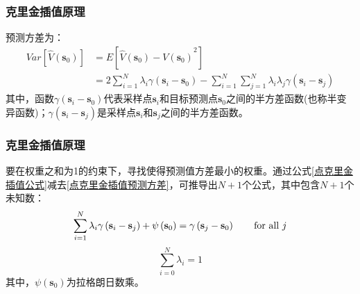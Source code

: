 \documentclass{beamer}
\begin{document}
\begin{frame}
    \frametitle{克里金插值原理}
    预测方差为：
    \begin{equation}
        \begin{split}
            Var\left[ \hat{V} \left( \mathbf{s}_{0} \right) \right]
            & = E\left[ {\hat{V}\left( \mathbf{s}_{0} \right) - V\left( \mathbf{s}_{0} \right)}^{2} \right]     \\
            & = 2 \sum_{i=1}^{N} \lambda_{i} \gamma\left( \mathbf{s}_{i} - \mathbf{s}_{0} \right) - \sum_{i=1}^{N} \sum_{j=1}^{N} \lambda_{i} \lambda_{j} \gamma\left( \mathbf{s}_{i} - \mathbf{s}_{j} \right)
        \end{split}
        \label{点克里金插值预测方差}
    \end{equation}
    其中，函数$ \gamma\left( \mathbf{s}_{i} - \mathbf{s}_{0} \right) $代表采样点$ \mathbf{s}_{i} $和目标预测点$ \mathbf{s}_{0} $之间的半方差函数(也称半变异函数)；$ \gamma\left( \mathbf{s}_{i} - \mathbf{s}_{j} \right) $是采样点$ \mathbf{s}_{i} $和$ \mathbf{s}_{j} $之间的半方差函数。
\end{frame}

\begin{frame}
    \frametitle{克里金插值原理}
    要在权重之和为1的约束下，寻找使得预测值方差最小的权重。通过公式\ref{点克里金插值公式}减去\ref{点克里金插值预测方差}，可推导出$ N+1 $个公式，其中包含$ N+1 $个未知数：
    \begin{equation}
        \sum_{i=1}^{N} \lambda_{i} \gamma \left( \mathbf{s}_{i} - \mathbf{s}_{j} \right) + \psi \left( \mathbf{s}_{0} \right) = \gamma \left( \mathbf{s}_{j} - \mathbf{s}_{0} \right) \qquad \text{for all $ j $}
        \label{点克里金法N个方程}
    \end{equation}
    \begin{equation}
        \sum_{i=0}^{N}\lambda_{i} = 1
        \label{点克里金法N+1个方程}
    \end{equation}
    其中，$ \psi \left( \mathbf{s}_{0} \right) $为拉格朗日数乘。
\end{frame}
\end{document}
